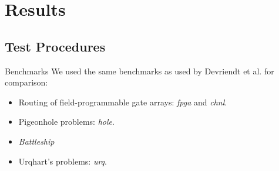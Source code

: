 \documentclass{beamer}
\begin{document}
\section{Results}

	\subsection{Test Procedures}
	\begin{frame}
		\begin{block}{Benchmarks}
			We used the same benchmarks as used by Devriendt et al. for comparison:
			\begin{itemize}
				\item Routing of field-programmable gate arrays: \emph{fpga} and \emph{chnl}.
				\item Pigeonhole problems: \emph{hole}.
				\item \emph{Battleship}
				\item Urqhart's problems: \emph{urq}.
			\end{itemize}
		\end{block}
	\end{frame}
	
\end{document}
